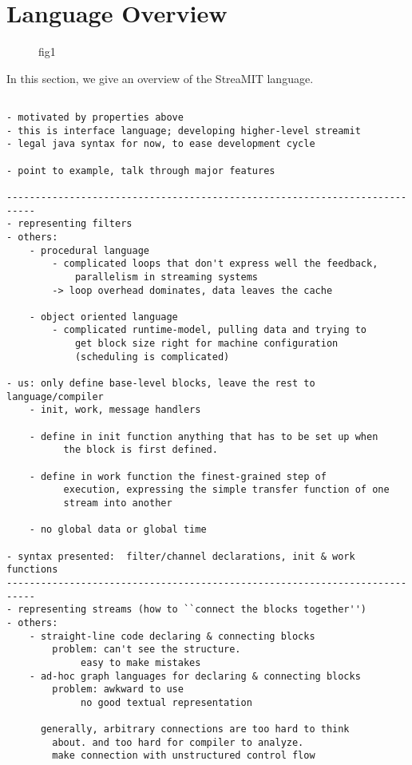 \section{Language Overview}

\begin{figure*}
\centering
{}
\caption{ fig1}
\label{fig:data_structs}
\end{figure*}

In this section, we give an overview of the StreaMIT language.

\begin{verbatim}

- motivated by properties above
- this is interface language; developing higher-level streamit
- legal java syntax for now, to ease development cycle

- point to example, talk through major features

---------------------------------------------------------------------------
- representing filters 
- others:
	- procedural language
		- complicated loops that don't express well the feedback,
			parallelism in streaming systems
		-> loop overhead dominates, data leaves the cache

	- object oriented language
		- complicated runtime-model, pulling data and trying to 
			get block size right for machine configuration
			(scheduling is complicated)

- us: only define base-level blocks, leave the rest to language/compiler
	- init, work, message handlers

	- define in init function anything that has to be set up when
          the block is first defined.

	- define in work function the finest-grained step of
          execution, expressing the simple transfer function of one
          stream into another

	- no global data or global time

- syntax presented:  filter/channel declarations, init & work functions
---------------------------------------------------------------------------
- representing streams (how to ``connect the blocks together'')
- others:
	- straight-line code declaring & connecting blocks
		problem: can't see the structure.
			 easy to make mistakes
	- ad-hoc graph languages for declaring & connecting blocks
		problem: awkward to use
			 no good textual representation

	  generally, arbitrary connections are too hard to think
		about. and too hard for compiler to analyze.
		make connection with unstructured control flow


\end{verbatim}
